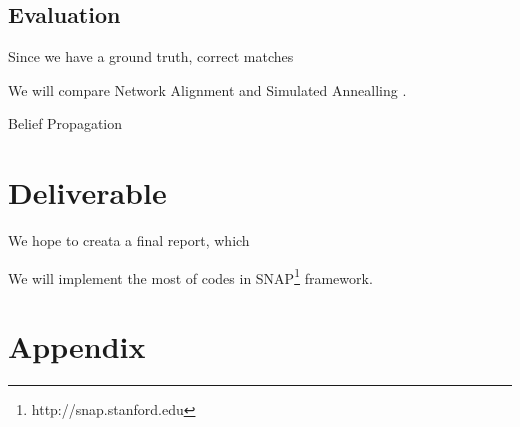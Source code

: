 \documentclass[11pt,letterpaper]{article}
\begin{document}
\subsection{Evaluation}

Since we have a ground truth, correct matches 

We will compare Network Alignment \cite{Narayanan2008} and Simulated Annealling \cite{Kreitmann2011}. 

Belief Propagation

\section{Deliverable}
We hope to creata a final report, which 

We will implement the most of codes in SNAP\footnote{http://snap.stanford.edu} framework.  

\nocite{Ding2010,Wanga,Peng2012,Klau2009,Wondracek2010,Balduzzi2010,Koutra2011,Bayati2009,Bradde2010,Cromi2009,Flannick2009,Memisevic2012,Kreitmann2011,Narayanan2009,Delcher2002,Kollias2012,Mohammadi,Kuchaiev2007,Wangb,Liao2009,El-Kebir2011,Shi,Bayati2009a,Pache2012,Pache2012a,Kollias2011,Doan,Bayatia,Koyuturk2006,Todor2007,Narayanan2008,Burkhart2010,Backstrom2007}





\section{Appendix}
\end{document}
